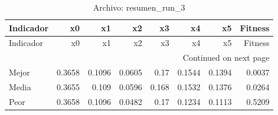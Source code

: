 \begin{longtable}{lrrrrrrr}
\caption{Archivo: resumen\_run\_3}\label{tab:resumen_run_3} \\
\toprule
Indicador & x0 & x1 & x2 & x3 & x4 & x5 & Fitness \\
\midrule
\endfirsthead
\toprule
Indicador & x0 & x1 & x2 & x3 & x4 & x5 & Fitness \\
\midrule
\endhead
\midrule
\multicolumn{8}{r}{Continued on next page} \\
\midrule
\endfoot
\bottomrule
\endlastfoot
Mejor & 0.3658 & 0.1096 & 0.0605 & 0.17 & 0.1544 & 0.1394 & 0.0037 \\
Media & 0.3655 & 0.109 & 0.0596 & 0.168 & 0.1532 & 0.1376 & 0.0264 \\
Peor & 0.3658 & 0.1096 & 0.0482 & 0.17 & 0.1234 & 0.1113 & 0.5209 \\
\end{longtable}